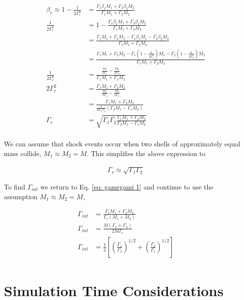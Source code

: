 \documentclass[linenumbers,twocolumn]{aastex631}
\begin{document}
\begin{appendix}
\begin{align}
	\beta_r \approx 1-\frac{1}{2\Gamma_r^2} &= \frac{\Gamma_1\beta_1M_1+\Gamma_2\beta_2M_2}{\Gamma_1M_1 + \Gamma_2M_2} \\
	\frac{1}{2\Gamma_r^2} &= 1 - \frac{\Gamma_1\beta_1M_1+\Gamma_2\beta_2M_2}{\Gamma_1M_1 + \Gamma_2M_2} \\ 
	&= \frac{\Gamma_1M_1 + \Gamma_2M_2 - \Gamma_1\beta_1M_1 - \Gamma_2\beta_2M_2 }{\Gamma_1M_1 + \Gamma_2M_2} \\
	&= \frac{\Gamma_1M_1 + \Gamma_2M_2 - \Gamma_1(1-\frac{1}{2\Gamma_1^2})M_1 - \Gamma_2(1-\frac{1}{2\Gamma_2^2})M_2 }{\Gamma_1M_1 + \Gamma_2M_2} \\
	\frac{1}{2\Gamma_r^2} &= \frac{\frac{M_1}{2\Gamma_1} - \frac{M_2}{2\Gamma_2}}{\Gamma_1M_1 + \Gamma_2M_2} \\
	2\Gamma_r^2 &= \frac{\Gamma_1M_1 + \Gamma_2M_2}{\frac{M_1}{2\Gamma_1} - \frac{M_2}{2\Gamma_2}} \\
	&= \frac{\Gamma_1M_1 + \Gamma_2M_2}{\frac{1}{2\Gamma_1\Gamma_2}(\Gamma_2M_1 - \Gamma_1M_2)} \\
	\Gamma_r &= \sqrt{\Gamma_1\Gamma_2\frac{\Gamma_1M_1 + \Gamma_2M_2}{\Gamma_2M_1 - \Gamma_1M_2}} \\
\end{align}

We can assume that shock events occur when two shells of approximately equal mass collide, $M_1 \approx M_2 = M$. This simplifies the above expression to

\begin{align}
	\Gamma_r \approx \sqrt{\Gamma_1\Gamma_2}
\end{align}

To find $\Gamma_{int}$ we return to Eq. \ref{eq: gamrgami 1} and continue to use the assumption $M_1 \approx M_2 = M$, 

\begin{align}
	\Gamma_{int} &= \frac{\Gamma_1M_1 + \Gamma_2M_2}{\Gamma_r(M_1+M_2)}\\
	\Gamma_{int} &= \frac{M(\Gamma_1 + \Gamma_2)}{2M\Gamma_r}\\
	\Gamma_{int} &= \frac{1}{2}\left[ \left(\frac{\Gamma_1}{\Gamma_2}\right)^{1/2} + \left(\frac{\Gamma_2}{\Gamma_1}\right)^{1/2}\right]\\
\end{align}

\section{Simulation Time Considerations}


\end{appendix}
\end{document}
